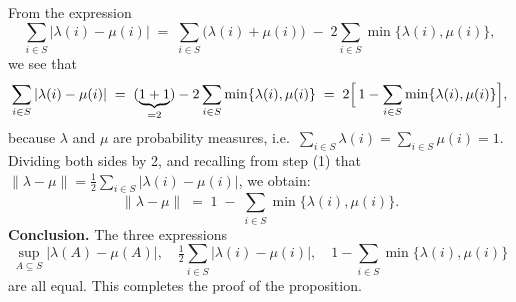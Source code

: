 \documentclass{article}
\begin{document}
{\medskip
\noindent
From the expression
\[
\sum_{i \in S} |\lambda(i) - \mu(i)|
\;=\;
\sum_{i \in S} \bigl(\lambda(i) + \mu(i)\bigr)
\;-\; 2 \sum_{i \in S} \min\{\lambda(i), \mu(i)\},
\]
we see that 
\[
\sum_{i \in S} |\lambda(i) - \mu(i)|
\;=\;
(\underbrace{1+1}_{=2}) - 2\sum_{i \in S} \min\{\lambda(i), \mu(i)\}
\;=\;
2 \Bigl[\,1 - \sum_{i \in S} \min\{\lambda(i), \mu(i)\}\Bigr],
\]
because $\lambda$ and $\mu$ are probability measures, i.e.\ $\sum_{i \in S}\lambda(i)=\sum_{i \in S}\mu(i)=1$. Dividing both sides by 2, and recalling from step (1) that $\|\lambda-\mu\| = \frac12 \sum_{i \in S}|\lambda(i)-\mu(i)|$, we obtain:
\[
\|\lambda - \mu\|
\;=\;
1 \;-\; \sum_{i \in S} \min\{\lambda(i), \mu(i)\}.
\]
\medskip
\noindent
\textbf{Conclusion.} The three expressions
\[
\sup_{A \subseteq S} \bigl|\lambda(A) - \mu(A)\bigr|,
\quad
\tfrac12 \sum_{i \in S} |\lambda(i) - \mu(i)|,
\quad
1 - \sum_{i \in S} \min\{\lambda(i), \mu(i)\}
\]
are all equal. This completes the proof of the proposition.
}
\end{document}
